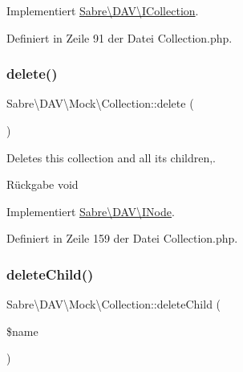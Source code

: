 Implementiert \mbox{\hyperlink{interface_sabre_1_1_d_a_v_1_1_i_collection_a837d88dac548706770368200f83c2ebc}{Sabre\textbackslash{}\+D\+A\+V\textbackslash{}\+I\+Collection}}.



Definiert in Zeile 91 der Datei Collection.\+php.

\mbox{\label{class_sabre_1_1_d_a_v_1_1_mock_1_1_collection_a7ac084bfb4f1ff2fd0c2f93155e2a5c6}} 
\subsubsection{\texorpdfstring{delete()}{delete()}}
{\footnotesize\ttfamily Sabre\textbackslash{}\+D\+A\+V\textbackslash{}\+Mock\textbackslash{}\+Collection\+::delete (\begin{DoxyParamCaption}{ }\end{DoxyParamCaption})}

Deletes this collection and all its children,.

\begin{DoxyReturn}{Rückgabe}
void 
\end{DoxyReturn}


Implementiert \mbox{\hyperlink{interface_sabre_1_1_d_a_v_1_1_i_node_a72cd0ee4e36dfced2b0412d14dbd73e6}{Sabre\textbackslash{}\+D\+A\+V\textbackslash{}\+I\+Node}}.



Definiert in Zeile 159 der Datei Collection.\+php.

\mbox{\label{class_sabre_1_1_d_a_v_1_1_mock_1_1_collection_abbb3c34e222824152a26a0e75718a164}} 
\subsubsection{\texorpdfstring{delete\+Child()}{deleteChild()}}
{\footnotesize\ttfamily Sabre\textbackslash{}\+D\+A\+V\textbackslash{}\+Mock\textbackslash{}\+Collection\+::delete\+Child (\begin{DoxyParamCaption}\item[{}]{\$name }\end{DoxyParamCaption})}

